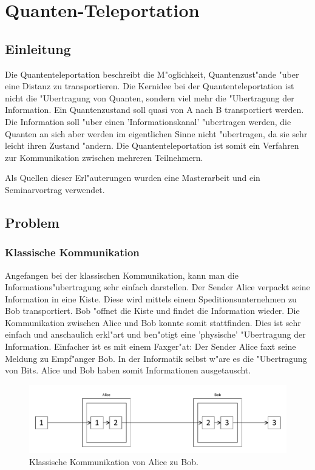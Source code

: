 \chapter{Quanten-Teleportation\label{chapter:teleport}}
\begin{refsection}

\section{Einleitung}

Die Quantenteleportation beschreibt die M"oglichkeit, Quantenzust"ande "uber eine Distanz zu transportieren. Die Kernidee bei der Quantenteleportation ist nicht die "Ubertragung von Quanten, sondern viel mehr die "Ubertragung der Information. Ein Quantenzustand soll quasi von A nach B transportiert werden. Die Information soll "uber einen 'Informationskanal' "ubertragen werden, die Quanten an sich aber werden im eigentlichen Sinne nicht "ubertragen, da sie sehr leicht ihren Zustand "andern. Die Quantenteleportation ist somit ein Verfahren zur Kommunikation zwischen mehreren Teilnehmern.

Als Quellen dieser Erl"auterungen wurden eine Masterarbeit \cite{teleport:mscthesis} und ein Seminarvortrag \cite{teleport:teleport-seminar} verwendet.

\section{Problem}
\subsection{Klassische Kommunikation}
Angefangen bei der klassischen Kommunikation, kann man die Informations"ubertragung sehr einfach darstellen. Der Sender Alice verpackt seine Information in eine Kiste. Diese wird mittels einem Speditionsunternehmen zu Bob transportiert. Bob "offnet die Kiste und findet die Information wieder. Die Kommunikation zwischen Alice und Bob konnte somit stattfinden. Dies ist sehr einfach und anschaulich erkl"art und ben"otigt eine 'physische' "Ubertragung der Information. Einfacher ist es mit einem Faxger"at: Der Sender Alice faxt seine Meldung zu Empf"anger Bob. In der Informatik selbst w"are es die "Ubertragung von Bits. Alice und Bob haben somit Informationen ausgetauscht.
\begin{figure}
\center
\includegraphics[width=1\textwidth]{teleport/image/classic_com.pdf}
\caption{Klassische Kommunikation von Alice zu Bob.}
\label{Klassische Kommunikation}
\end{figure}

\end{refsection}
